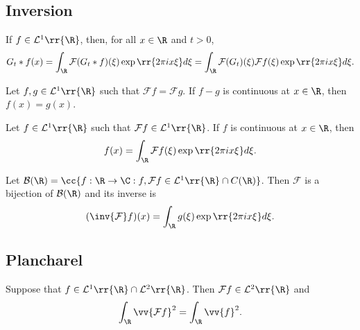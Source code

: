 \documentclass{article}
\begin{document}
\subsection{Inversion}

\begin{lemma}
  If $f\in\mathcal L^1\rr{\R}$, then, for all $x\in\R$ and $t>0$,
  \begin{align*}
    G_t * f(x) = \int_\R \mathcal F(G_t * f)(\xi)\exp\rr{2\pi ix\xi} d\xi
    = \int_\R \mathcal F(G_t)(\xi)\mathcal Ff(\xi)\exp\rr{2\pi ix\xi} d\xi.
  \end{align*}
\end{lemma}

\begin{theorem}
  Let $f,g\in\mathcal L^1\rr{\R}$ such that $\mathcal Ff=\mathcal Fg$.
  If $f-g$ is continuous at $x\in\R$, then $f(x)=g(x)$.
\end{theorem}

\begin{theorem}
  Let $f\in\mathcal L^1\rr{\R}$ such that $\mathcal Ff\in\mathcal L^1\rr{\R}$. If $f$ is continuous at $x\in\R$, then
  \begin{align*}
    f(x) = \int_\R \mathcal Ff(\xi)\exp\rr{2\pi ix\xi} d\xi.
  \end{align*}
\end{theorem}

\begin{corollary}
  Let $\mathcal B(\R) = \cc{f:\R\to\C : f,\mathcal Ff\in\mathcal L^1\rr{\R}\cap C(\R)}$. Then $\mathcal F$ is a bijection of $\mathcal B(\R)$ and
  its inverse is
  \begin{align*}
    (\inv{\mathcal F}f)(x) = \int_\R g(\xi)\exp\rr{2\pi ix\xi} d\xi.
  \end{align*}
\end{corollary}

\subsection{Plancharel}

\begin{theorem}[Plancherel]
  Suppose that $f\in\mathcal L^1\rr{\R}\cap\mathcal L^{2}\rr{\R}$. Then
  $\mathcal F f\in\mathcal L^{2}\rr{\R}$ and
  \begin{align*}
    \int_\R \vv{\mathcal Ff}^2 = \int_\R \vv{f}^2.
  \end{align*}
\end{theorem}
\end{document}
